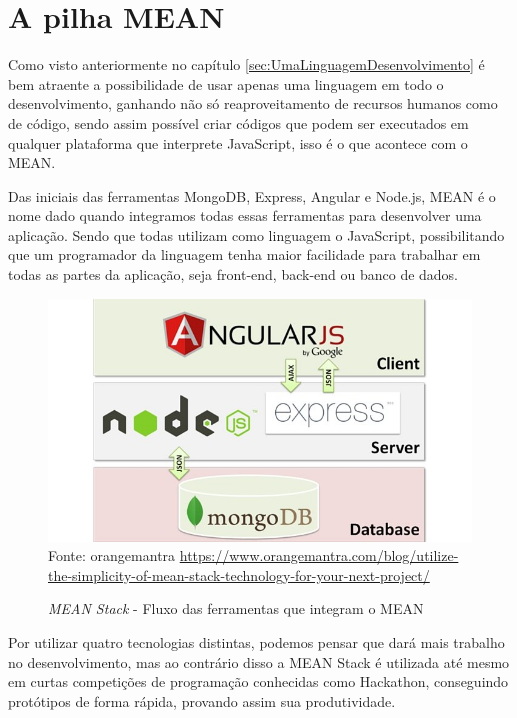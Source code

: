 \documentclass[
	12pt,				%
	openright,			%
	twoside,			%
	a4paper,			%
	english,			%
	brazil				%
	]{abntex2}
\begin{document}
\section{A pilha MEAN}

Como visto anteriormente no capítulo \ref{sec:UmaLinguagemDesenvolvimento} é bem atraente a possibilidade de usar apenas uma linguagem em todo o desenvolvimento, ganhando não só reaproveitamento de recursos humanos como de código, sendo assim possível criar códigos que podem ser executados em qualquer plataforma que interprete JavaScript, isso é o que acontece com o MEAN.

Das iniciais das ferramentas MongoDB, Express, Angular e Node.js, MEAN é o nome dado quando integramos todas essas ferramentas para desenvolver uma aplicação. Sendo que todas utilizam como linguagem o JavaScript, possibilitando que um programador da linguagem tenha maior facilidade para trabalhar em todas as partes da aplicação, seja front-end, back-end ou banco de dados.

\begin{figure}[h]
	\centering

	\caption{\textit{MEAN Stack} - Fluxo das ferramentas que integram o MEAN} \label{fig:MEANStackFlow}
    \includegraphics[scale=0.5]{mean-stack-flow} \\
    Fonte: {orangemantra \url{https://www.orangemantra.com/blog/utilize-the-simplicity-of-mean-stack-technology-for-your-next-project/}}

\end{figure}

Por utilizar quatro tecnologias distintas, podemos pensar que dará mais trabalho no desenvolvimento, mas ao contrário disso a MEAN Stack é utilizada até mesmo em curtas competições de programação conhecidas como Hackathon, conseguindo protótipos de forma rápida, provando assim sua produtividade.
\end{document}
